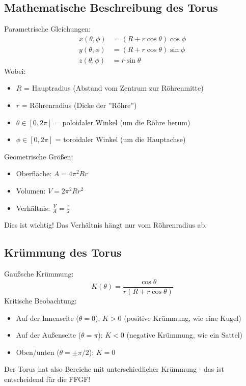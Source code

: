 	\subsection{Mathematische Beschreibung des Torus}
	Parametrische Gleichungen:
	\begin{align}
		x(\theta, \phi) &= (R + r \cos \theta) \cos \phi \\
		y(\theta, \phi) &= (R + r \cos \theta) \sin \phi \\
		z(\theta, \phi) &= r \sin \theta
	\end{align}
	Wobei:
	\begin{itemize}
		\item \( R \) = Hauptradius (Abstand vom Zentrum zur Röhrenmitte)
		\item \( r \) = Röhrenradius (Dicke der ''Röhre'')
		\item \( \theta \in [0, 2\pi] \) = poloidaler Winkel (um die Röhre herum)
		\item \( \phi \in [0, 2\pi] \) = toroidaler Winkel (um die Hauptachse)
	\end{itemize}
	
	Geometrische Größen:
	\begin{itemize}
		\item Oberfläche: \( A = 4\pi^2 R r \)
		\item Volumen: \( V = 2\pi^2 R r^2 \)
		\item Verhältnis: \( \frac{V}{A} = \frac{r}{2} \)
	\end{itemize}
	Dies ist wichtig! Das Verhältnis hängt nur vom Röhrenradius ab.
	
	\subsection{Krümmung des Torus}
	Gaußsche Krümmung:
	\[
	K(\theta) = \frac{\cos \theta}{r(R + r \cos \theta)}
	\]
	Kritische Beobachtung:
	\begin{itemize}
		\item Auf der Innenseite (\( \theta = 0 \)): \( K > 0 \) (positive Krümmung, wie eine Kugel)
		\item Auf der Außenseite (\( \theta = \pi \)): \( K < 0 \) (negative Krümmung, wie ein Sattel)
		\item Oben/unten (\( \theta = \pm\pi/2 \)): \( K = 0 \)
	\end{itemize}
	Der Torus hat also Bereiche mit unterschiedlicher Krümmung - das ist entscheidend für die FFGF!
	
